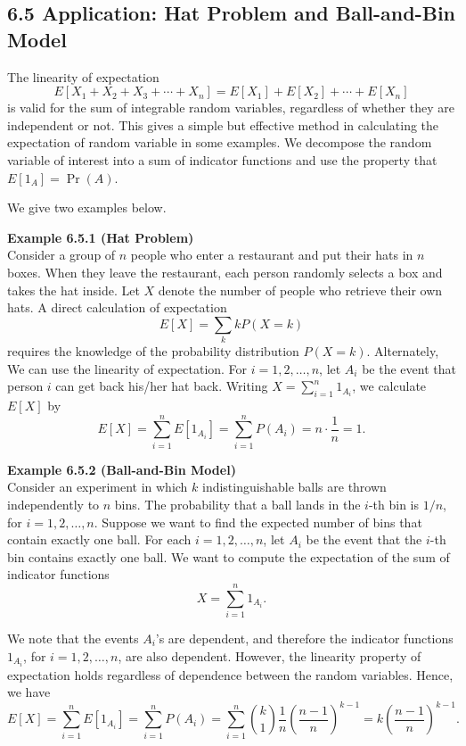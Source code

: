 \subsection*{6.5 Application: Hat Problem and Ball-and-Bin Model}

The linearity of expectation
\[
E[X_1 + X_2 + X_3 + \cdots + X_n] = E[X_1] + E[X_2] + \cdots + E[X_n]
\]
is valid for the sum of integrable random variables, regardless of whether they are independent or not. This gives a simple but effective method in calculating the expectation of random variable in some examples. We decompose the random variable of interest into a sum of indicator functions and use the property that $E[1_A] = \Pr(A)$.

We give two examples below.

\textbf{Example 6.5.1 (Hat Problem)} \\
Consider a group of $n$ people who enter a restaurant and put their hats in $n$ boxes. When they leave the restaurant, each person randomly selects a box and takes the hat inside. Let $X$ denote the number of people who retrieve their own hats. A direct calculation of expectation
\[
E[X] = \sum_k kP(X=k)
\]
requires the knowledge of the probability distribution $P(X=k)$. Alternately, We can use the linearity of expectation. For $i=1,2,\dots,n$, let $A_i$ be the event that person $i$ can get back his/her hat back. Writing $X=\sum_{i=1}^{n} 1_{A_i}$, we calculate $E[X]$ by
\[
E[X] = \sum_{i=1}^{n} E[1_{A_i}] = \sum_{i=1}^{n} P(A_i) = n\cdot \frac{1}{n} = 1.
\]

\textbf{Example 6.5.2 (Ball-and-Bin Model)} \\
Consider an experiment in which $k$ indistinguishable balls are thrown independently to $n$ bins. The probability that a ball lands in the $i$-th bin is $1/n$, for $i=1,2,\dots,n$. Suppose we want to find the expected number of bins that contain exactly one ball. For each $i=1,2,\dots,n$, let $A_i$ be the event that the $i$-th bin contains exactly one ball. We want to compute the expectation of the sum of indicator functions
\[
X=\sum_{i=1}^{n} 1_{A_i}.
\]

We note that the events $A_i$'s are dependent, and therefore the indicator functions $1_{A_i}$, for $i=1,2,\dots,n$, are also dependent. However, the linearity property of expectation holds regardless of dependence between the random variables. Hence, we have
\[
E[X] = \sum_{i=1}^{n} E[1_{A_i}] = \sum_{i=1}^{n} P(A_i)
= \sum_{i=1}^{n} \binom{k}{1}\frac{1}{n}\left(\frac{n-1}{n}\right)^{k-1}
= k\left(\frac{n-1}{n}\right)^{k-1}.
\]

